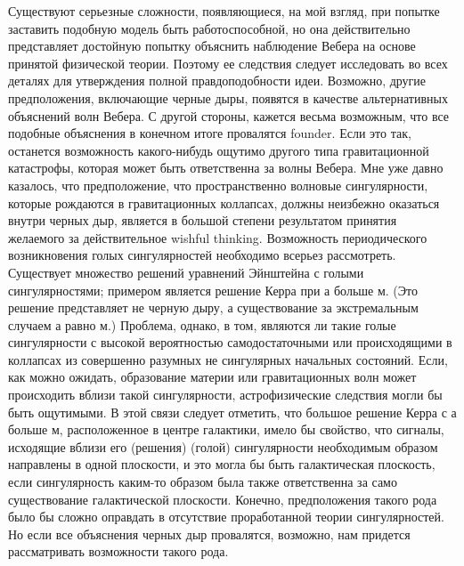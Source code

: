 \documentclass[a4paper, 10pt, twocolumn]{article}
\def\q#1{{\color{red} #1}}
\begin{document}
Существуют серьезные сложности, появляющиеся, на мой взгляд, при 
попытке заставить подобную модель быть работоспособной, но она 
действительно представляет достойную попытку объяснить наблюдение Вебера 
на основе принятой физической теории. Поэтому ее следствия следует 
исследовать во всех деталях для утверждения полной правдоподобности 
идеи. Возможно, другие предположения, включающие черные дыры, появятся 
в качестве альтернативных объяснений волн Вебера. С другой стороны, 
кажется весьма возможным, что все подобные объяснения в конечном итоге 
провалятся \q{founder}. Если это так, останется возможность 
какого-нибудь ощутимо другого типа гравитационной катастрофы, которая 
может быть ответственна за волны Вебера. Мне уже давно казалось, что 
предположение, что пространственно волновые сингулярности, которые 
рождаются в гравитационных коллапсах, должны неизбежно оказаться внутри 
черных дыр, является в большой степени результатом принятия желаемого за 
действительное \q{wishful thinking}. Возможность периодического 
возникновения голых сингулярностей необходимо всерьез рассмотреть. 
Существует множество решений уравнений Эйнштейна с голыми 
сингулярностями; примером является решение Керра при а больше м. (Это 
решение представляет не черную дыру, а существование за экстремальным 
случаем а равно м.) Проблема, однако, в том, являются ли такие голые 
сингулярности с высокой вероятностью самодостаточными или происходящими 
в коллапсах из совершенно разумных не сингулярных начальных состояний. 
Если, как можно ожидать, образование материи или гравитационных волн 
может происходить вблизи такой сингулярности, астрофизические следствия 
могли бы быть ощутимыми. В этой связи следует отметить, что большое 
решение Керра с а больше м, расположенное в центре галактики, имело бы 
свойство, что сигналы, исходящие вблизи его (решения) (голой) 
сингулярности необходимым образом направлены в одной плоскости, и это 
могла бы быть галактическая плоскость, если сингулярность каким-то 
образом была также ответственна за само существование галактической 
плоскости. Конечно, предположения такого рода было бы сложно оправдать 
в отсутствие проработанной теории сингулярностей. Но если все объяснения 
черных дыр провалятся, возможно, нам придется рассматривать возможности 
такого рода.


\end{document}
